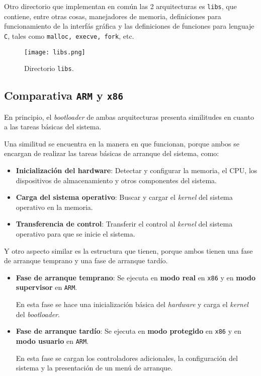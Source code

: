 	
	
	Otro directorio que implementan en común las 2 arquitecturas es \texttt{libs}, que contiene, entre otras cosas, manejadores de memoria, definiciones para funcionamiento de la interfás gráfica y las definiciones de funciones para lenguaje \texttt{C}, tales como \texttt{malloc, execve, fork}, etc.
	\begin{figure}[ht]
		\centering
		\texttt{[image: libs.png]}
		\caption{
			Directorio \texttt{libs}.
			\label{fig:libs}
		}
	\end{figure}
	

\newpage
\subsection{Comparativa \texttt{ARM} y \texttt{x86}}
	En principio, el \textit{bootloader} de ambas arquitecturas presenta similitudes en cuanto a las tareas básicas del sistema.
	
	
	
	Una similitud se encuentra en la manera en que funcionan, porque ambos se encargan de realizar las tareas básicas de arranque del sistema, como:
	\begin{itemize} \setlength\itemsep{0pt}
		\item \textbf{Inicialización del hardware}: Detectar y configurar la memoria, el CPU, los dispositivos de almacenamiento y otros componentes del sistema.
		
		\item \textbf{Carga del sistema operativo}: Buscar y cargar el \textit{kernel} del sistema operativo en la memoria.
		
		\item \textbf{Transferencia de control}: Transferir el control al \textit{kernel} del sistema operativo para que se inicie el sistema.
	\end{itemize}

	Y otro aspecto similar es la estructura que tienen, porque ambos tienen una fase de arranque temprano y una fase de arranque tardío.
	\begin{itemize} \setlength\itemsep{0pt}
		\item \textbf{Fase de arranque temprano}: Se ejecuta en \textbf{modo real} en \texttt{x86} y en \textbf{modo supervisor} en \texttt{ARM}. 
		
		
		
		En esta fase se hace una inicialización básica del \textit{hardware} y carga el \textit{kernel} del \textit{bootloader}.
		
		
		\item \textbf{Fase de arranque tardío}: Se ejecuta en \textbf{modo protegido} en \texttt{x86} y en \textbf{modo usuario} en \texttt{ARM}. 
		
		
		
		En esta fase se cargan los controladores adicionales, la configuración del sistema y la presentación de un menú de arranque.
	\end{itemize}
	
